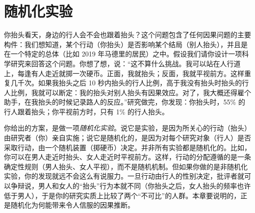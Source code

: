 \providecommand{\ciLeafA}[6]{%
  \begin{scope}[shift={(#1,#2)}]
    \draw[thin] (0,0) ellipse (1.30 and 0.62);
    \draw[thin] (-1.26,-0.15) -- (1.26,0.15);
    \node[font=\footnotesize,inner sep=0pt] at (0,0.31) {#3};
    \node[font=\footnotesize,inner sep=0pt] at (0,-0.31) {#4};
    \node[font=\footnotesize,anchor=west,inner sep=0pt] at (1.40,0.31) {#5};
    \node[font=\footnotesize,anchor=west,inner sep=0pt] at (1.40,-0.31) {#6};
  \end{scope}%
}
\providecommand{\ciLeafB}[6]{%
  \begin{scope}[shift={(#1,#2)}]
    \draw[thin] (0,0) ellipse (1.00 and 0.44);
    \draw[thin] (-0.97,-0.11) -- (0.97,0.11);
    \node[font=\scriptsize,inner sep=0pt] at (0,0.21) {#3};
    \node[font=\scriptsize,inner sep=0pt] at (0,-0.21) {#4};
    \node[font=\scriptsize,anchor=west,inner sep=0pt] at (1.08,0.21) {#5};
    \node[font=\scriptsize,anchor=west,inner sep=0pt] at (1.08,-0.21) {#6};
  \end{scope}%
}

\chapter{随机化实验}

你抬头看天，身边的行人会不会也跟着抬头？这个问题包含了任何因果问题的主要构件：我们想知道，某个行动（你抬头）是否影响某个结局（别人抬头），并且是在一个特定的总体（比如 2019 年马德里的居民）之中。假设我们请你设计一项科学研究来回答这个问题。你想了想，说：“这不算什么挑战。我可以站在人行道上，每逢有人走近就掷一次硬币。正面，我就抬头；反面，我就平视前方。这样重复几千次。如果我抬头之后 10 秒内抬头的行人比例，高于我没有抬头时抬头的行人比例，我就可以断定：我的抬头对别人抬头有因果效应。对了，我大概还得雇个助手，在我抬头的时候记录路人的反应。”研究做完，你发现：你抬头时，55\% 的行人跟着抬头；你平视前方时，只有 1\% 的行人抬头。

你给出的方案，是做一项\emph{随机化实验}。说它是实验，是因为所关心的行动（抬头）由研究者（你）亲自实施；说它是随机化的，是因为对每个研究对象（行人）是否采取行动，由一个随机装置（掷硬币）决定。并非所有实验都是随机化的。比如，你可以在男人走近时抬头、女人走近时平视前方。这样，行动的分配遵循的是一条确定性规则（男人抬头、女人平视），而不是随机机制。但如果你做的是非随机化实验，你的发现就远不会这么有说服力。一旦行动由行人的性别决定，批评者就可以争辩说，男人和女人的“抬头”行为本就不同（你抬头之后，女人抬头的频率也许低于男人），于是你的研究实质上比较了两个“不可比”的人群。本章要说明的，正是随机化为何能带来令人信服的因果推断。

